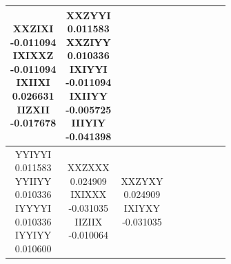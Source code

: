\documentclass[twocolumn]{revtex4-1}
\newcommand{\1}{\mathbbm{1}}
\begin{document}
\begin{longtable}{|c|c|c|c|c|c|c|c|c|}
{XXZIXI\\
-0.011094\\ 
IXIXXZ\\
-0.011094\\ 
IXIIXI\\
0.026631\\ 
IIZXII\\
-0.017678\\ 
\vspace{.5\baselineskip}}
&
\parbox{1.9cm}{\centering\vspace{.5\baselineskip}
XXZYYI\\
0.011583\\ 
XXZIYY\\
0.010336\\ 
IXIYYI\\
-0.011094\\ 
IXIIYY\\
-0.005725\\ 
IIIYIY\\
-0.041398\\ 
\vspace{.5\baselineskip}}\\									%
\hline
\parbox{1.9cm}{\centering\vspace{.5\baselineskip}
YYIYYI\\
0.011583\\ 
YYIIYY\\
0.010336\\ 
IYYYYI\\
0.010336\\ 
IYYIYY\\
0.010600\\ 
\vspace{.5\baselineskip}}
&
\parbox{1.9cm}{\centering\vspace{.5\baselineskip}
XXZXXX\\
0.024909\\ 
IXIXXX\\
-0.031035\\ 
IIZIIX\\
-0.010064\\ 
\vspace{.5\baselineskip}}
&
\parbox{1.9cm}{\centering\vspace{.5\baselineskip}
XXZYXY\\
0.024909\\ 
IXIYXY\\
-0.031035\\ 
\vspace{.5\baselineskip}}
&
\parbox{1.9cm}{\centering\vspace{.5\baselineskip}
}
\end{longtable}
\end{document}
